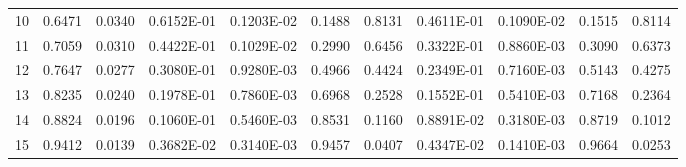 \documentclass[
twocolumn,
aps,prd,
nofootinbib,
superscriptaddress,
showpacs,ligh
tightenlines, 
]{revtex4}
\begin{document}
\begin{widetext}
\begin{table}[h]
\begin{center}
\begin{tabular}{|c|c|c|c|c|c|c|c|c|c|c|}
      10                 &        0.6471             &        0.0340             &     0.6152E-01             &     0.1203E-02             &        0.1488             &        0.8131             & 0.4611E-01 & 0.1090E-02 & 0.1515 & 0.8114 \\
      11                &        0.7059             &        0.0310             &     0.4422E-01             &     0.1029E-02             &        0.2990             &        0.6456             & 0.3322E-01 & 0.8860E-03 & 0.3090 & 0.6373 \\
      12                 &        0.7647             &        0.0277             &     0.3080E-01             &     0.9280E-03             &        0.4966             &        0.4424             & 0.2349E-01 & 0.7160E-03 & 0.5143 & 0.4275 \\
      13                &        0.8235             &        0.0240             &     0.1978E-01             &     0.7860E-03             &        0.6968             &        0.2528             & 0.1552E-01 & 0.5410E-03 & 0.7168 & 0.2364 \\
      14                &        0.8824             &        0.0196             &     0.1060E-01             &     0.5460E-03             &        0.8531             &        0.1160             & 0.8891E-02 & 0.3180E-03 & 0.8719 & 0.1012 \\
      15                 &        0.9412             &        0.0139             &     0.3682E-02             &     0.3140E-03             &        0.9457             &        0.0407             & 0.4347E-02 & 0.1410E-03 & 0.9664 & 0.0253 \\

 \hline
\hline


\end{tabular}
\label{table:7P} 
\end{center}
 \end{table}
\end{widetext}


\clearpage

\end{document}

